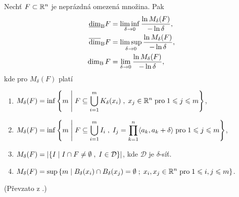 \begin{theorem}\label{thm:ekvivalentni-def-box-counting-dimenze}
    Nechť $F\subset \mathbb{R}^n$ je neprázdná omezená množina. Pak
    \begin{align*}
        \underline{\dim}_\text{B}{F}&=\liminf_{\delta\to 0}\dfrac{\ln{M_\delta(F)}}{-\ln{\delta}},\\
        \overline{\dim}_\text{B}{F}&=\limsup_{\delta\to 0}\dfrac{\ln{M_\delta(F)}}{-\ln{\delta}},\\
        \operatorname{dim_B}{F}&=\lim_{\delta\to 0}\dfrac{\ln{M_\delta(F)}}{-\ln{\delta}},
    \end{align*}
    kde pro $M_\delta(F)$ platí
    \begin{enumerate}[label=(\roman*)]
        \item\label{thm:pokryti-delta-uz-koulemi} $\displaystyle M_\delta(F)=\inf\left\{m\;\middle|\;F\subseteq\bigcup\limits_{i=1}^m K_\delta(x_i)\;,\;x_j\in\mathbb{R}^n\;\text{pro}\;1\leqslant j\leqslant m\right\}$,
        \item\label{thm:pokryti-delta-kvadry} $\displaystyle M_\delta(F)=\inf\left\{m\;\middle|\;F\subseteq\bigcup\limits_{i=1}^m I_i\;,\;I_j=\prod_{k=1}^{n}\langle a_k,a_k+\delta\rangle\;\text{pro}\;1\leqslant j\leqslant m\right\}$,
        \item\label{thm:pokryti-delta-sit} $\displaystyle M_\delta(F)=\left|\left\{I\;\middle|\;I\cap F\neq\emptyset\;,\;I\in\mathcal{D}\right\}\right|$, kde $\mathcal{D}$ je $\delta$-síť.
        \item\label{thm:pokryti-delta-dis-ot-koulemi} $\displaystyle M_\delta(F)=\sup\left\{m\;\middle|\;B_\delta(x_i)\cap B_\delta(x_j)=\emptyset\;;\;x_i,x_j\in\mathbb{R}^n\;\text{pro}\;1\leqslant i,j\leqslant m\right\}$.
    \end{enumerate}
\end{theorem}
(Převzato z \citep[str. 30]{Falconer2014}.)

